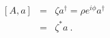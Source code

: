 \begin{equation}
  \begin{array}{lcl}
[A,a] &=& \zeta a^\dagger = \rho e^{i\phi} a^\dagger \\

[A,a^\dagger] &=& \zeta^* a~.
  \end{array}
\end{equation}

